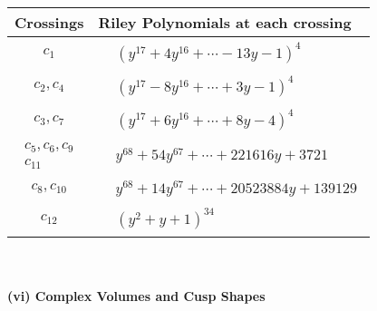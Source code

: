 \documentclass[1p]{elsarticle_modified}
\theoremstyle{definition}
\begin{document}
\begin{tabular}{m{50pt}|m{274pt}}
Crossings & \hspace{64pt}Riley Polynomials at each crossing \\
\hline $$\begin{aligned}c_{1}\end{aligned}$$&$\begin{aligned}
&(y^{17}+4 y^{16}+\cdots-13 y-1)^{4}
\end{aligned}$\\
\hline $$\begin{aligned}c_{2},c_{4}\end{aligned}$$&$\begin{aligned}
&(y^{17}-8 y^{16}+\cdots+3 y-1)^{4}
\end{aligned}$\\
\hline $$\begin{aligned}c_{3},c_{7}\end{aligned}$$&$\begin{aligned}
&(y^{17}+6 y^{16}+\cdots+8 y-4)^{4}
\end{aligned}$\\
\hline $$\begin{aligned}c_{5},c_{6},c_{9}\\c_{11}\end{aligned}$$&$\begin{aligned}
&y^{68}+54 y^{67}+\cdots+221616 y+3721
\end{aligned}$\\
\hline $$\begin{aligned}c_{8},c_{10}\end{aligned}$$&$\begin{aligned}
&y^{68}+14 y^{67}+\cdots+20523884 y+139129
\end{aligned}$\\
\hline $$\begin{aligned}c_{12}\end{aligned}$$&$\begin{aligned}
&(y^2+y+1)^{34}
\end{aligned}$\\
\hline
\end{tabular}\\~\\
\newpage\flushleft \textbf{(vi) Complex Volumes and Cusp Shapes}
\end{document}
